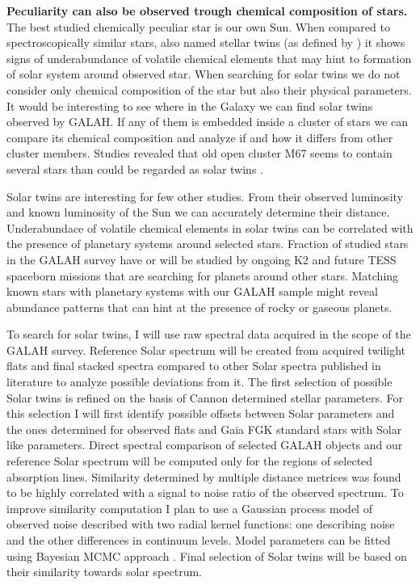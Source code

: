 \textbf{Peculiarity can also be observed trough chemical composition of stars.} The best studied chemically peculiar star is our own Sun. When compared to spectroscopically similar stars, also named stellar twins (as defined by \cite{2017AN....338..442A}) it shows signs of underabundance of volatile chemical elements \cite{2009ApJ...704L..66M} that may hint to formation of solar system around observed star. When searching for solar twins we do not consider only chemical composition of the star but also their physical parameters. It would be interesting to see where in the Galaxy we can find solar twins observed by GALAH. If any of them is embedded inside a cluster of stars we can compare its chemical composition and analyze if and how it differs from other cluster members. Studies revealed that old open cluster M67 seems to contain several stars than could be regarded as solar twins \cite{2009MmSAI..80..125B, 2016MNRAS.463..696L}.

Solar twins are interesting for few other studies. From their observed luminosity and known luminosity of the Sun we can accurately determine their distance. Underabundace of volatile chemical elements in solar twins can be correlated with the presence of planetary systems around selected stars. Fraction of studied stars in the GALAH survey have or will be studied by ongoing K2 \cite{2014PASP..126..398H} and future TESS \cite{2014SPIE.9143E..20R} spaceborn missions that are searching for planets around other stars. Matching known stars with planetary systems with our GALAH sample might reveal abundance patterns that can hint at the presence of rocky or gaseous planets.

To search for solar twins, I will use raw spectral data acquired in the scope of the GALAH survey. Reference Solar spectrum will be created from acquired twilight flats and final stacked spectra compared to other Solar spectra published in literature to analyze possible deviations from it. The first selection of possible Solar twins is refined on the basis of Cannon \cite{2015ApJ...808...16N} determined stellar parameters. For this selection I will first identify possible offsets between Solar parameters and the ones determined for observed flats and Gaia FGK standard stars \cite{2014A&A...564A.133J, 2015A&A...582A..49H} with Solar like parameters. Direct spectral comparison of selected GALAH objects and our reference Solar spectrum will be computed only for the regions of selected absorption lines. Similarity determined by multiple distance metrices was found to be highly correlated with a signal to noise ratio of the observed spectrum. To improve similarity computation I plan to use a Gaussian process \cite{2006gpml.book.....R} model of observed noise described with two radial kernel functions: one describing noise and the other differences in continuum levels. Model parameters can be fitted using Bayesian MCMC approach \cite{2013PASP..125..306F}. Final selection of Solar twins will be based on their similarity towards solar spectrum.